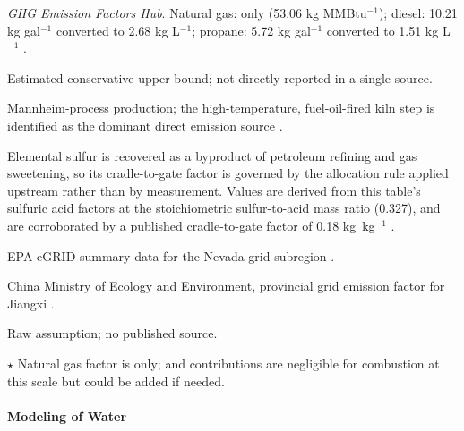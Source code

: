 \documentclass{article}
\renewcommand\_{\textunderscore\allowbreak}
\begin{document}
\begin{table}[htbp]
\begin{ThreePartTable}
\begin{tablenotes}[flushleft]
          \textit{GHG Emission Factors Hub}.
          Natural gas:  only (53.06 kg  MMBtu$^{-1}$);
          diesel: 10.21 kg  gal$^{-1}$ converted to
          2.68 kg  L$^{-1}$;
          propane: 5.72 kg  gal$^{-1}$ converted to
          1.51 kg  L$^{-1}$ \citep{usepaEmissionFactorsGreenhouse2025}.
    \item[\textit{e}]\hspace{0.05cm} Estimated conservative upper bound; not directly reported in a single source.
    \item[\textit{f}]\hspace{0.05cm} Mannheim-process production; the high-temperature, fuel-oil-fired kiln step is identified as the dominant direct emission source \citep{farahaniAssessingEnergyLoad2024}.
    \item[\textit{g}]\hspace{0.05cm} Elemental sulfur is recovered as a byproduct of petroleum refining and gas sweetening, so its cradle-to-gate factor is governed by the allocation rule applied upstream rather than by measurement. Values are derived from this table's sulfuric acid factors at the stoichiometric sulfur-to-acid mass ratio (0.327), and are corroborated by a published cradle-to-gate factor of 0.18 kg \,kg$^{-1}$ \citep{bafaInformationsblattCO2FaktorenVersion2026}. 
    \item[\textit{h}]\hspace{0.05cm} EPA eGRID summary data for the Nevada grid
          subregion \citep{usepaSummaryData2025}.
    \item[\textit{i}]\hspace{0.05cm} China Ministry of Ecology and Environment,
          provincial grid emission factor for Jiangxi \citep{ministryofecologyandenvironmentGuanYuFaBu2023NianDianLiErYangHuaTanPaiFangYinZiDeGongGaoAnnouncementRelease2025}.
    \item[\textit{j}]\hspace{0.05cm} Raw assumption; no published source.
    \item[$\dagger$] 
          $\star$ Natural gas factor is  only;  and
           contributions are negligible for combustion at this scale but could be added if needed.
  \end{tablenotes}
\end{ThreePartTable}
\end{table}

\paragraph{Modeling of Water}\label{app:04-methods-system-water}\leavevmode\par
\end{document}
